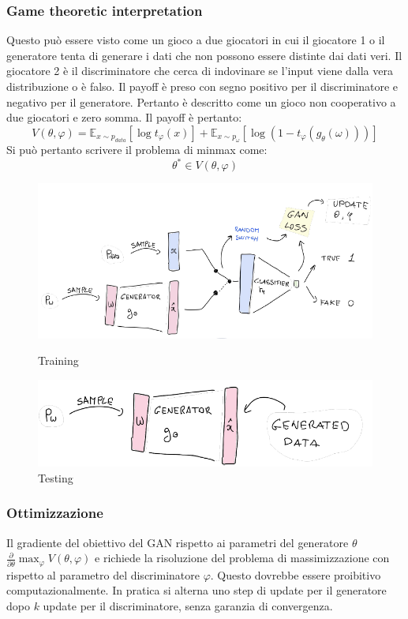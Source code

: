 \subsubsection{Game theoretic interpretation}
Questo pu\`o essere visto come un gioco a due giocatori in cui il giocatore 1 o il generatore tenta di generare i dati che non possono essere distinte dai dati veri.
Il giocatore 2 \`e il discriminatore che cerca di indovinare se l'input viene dalla vera distribuzione o \`e falso.
Il payoff \`e preso con segno positivo per il discriminatore e negativo per il generatore.
Pertanto \`e descritto come un gioco non cooperativo a due giocatori e zero somma.
Il payoff \`e pertanto:
$$V(\theta,\varphi) = \mathbb{E}_{x\sim p_{data}}[\log t_\varphi(x)]+\mathbb{E}_{x\sim p_\omega}[\log(1-t_\varphi(g_\theta(\omega)))]$$
Si pu\`o pertanto scrivere il problema di minmax come:
$$\theta^*\in V(\theta,\varphi)$$

\begin{figure}
	\centering
	\begin{minipage}{.5\textwidth}
		\centering
		\includegraphics[width=1\linewidth]{imgs/chapter12/img16}
		\caption{Training}
		\label{fig:chapter12-16}
	\end{minipage}%
	\begin{minipage}{.5\textwidth}
		\centering
		\includegraphics[width=1\linewidth]{imgs/chapter12/img17}
		\caption{Testing}
		\label{fig:chapter12-17}
	\end{minipage}
\end{figure}

\subsubsection{Ottimizzazione}
Il gradiente del obiettivo del GAN rispetto ai parametri del generatore $\theta$ $\frac{\partial}{\partial\theta}\max_\varphi V(\theta,\varphi)$ e richiede la risoluzione del problema di massimizzazione con rispetto al parametro del discriminatore $\varphi$.
Questo dovrebbe essere proibitivo computazionalmente.
In pratica si alterna uno step di update per il generatore dopo $k$ update per il discriminatore, senza garanzia di convergenza.

